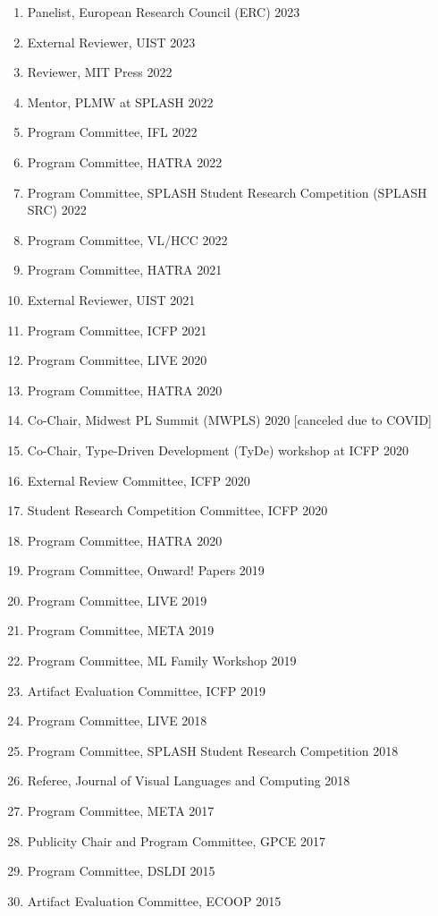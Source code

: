 \documentclass[10pt,letterpaper]{article}
\begin{document}
\begin{enumerate}
  \item Panelist, European Research Council (ERC) 2023
  \item External Reviewer, UIST 2023
  \item Reviewer, MIT Press 2022
  \item Mentor, PLMW at SPLASH 2022
  \item Program Committee, IFL 2022
  \item Program Committee, HATRA 2022
  \item Program Committee, SPLASH Student Research Competition (SPLASH SRC) 2022
  \item Program Committee, VL/HCC 2022
  \item Program Committee, HATRA 2021
  \item External Reviewer, UIST 2021
  \item Program Committee, ICFP 2021
  \item Program Committee, LIVE 2020
  \item Program Committee, HATRA 2020
  \item Co-Chair, Midwest PL Summit (MWPLS) 2020 [canceled due to COVID]
  \item Co-Chair, Type-Driven Development (TyDe) workshop at ICFP 2020
  \item External Review Committee, ICFP 2020
  \item Student Research Competition Committee, ICFP 2020
  \item Program Committee, HATRA 2020
  \item Program Committee, Onward! Papers 2019
  \item Program Committee, LIVE 2019
  \item Program Committee, META 2019
  \item Program Committee, ML Family Workshop 2019
  \item Artifact Evaluation Committee, ICFP 2019
  \item Program Committee, LIVE 2018
  \item Program Committee, SPLASH Student Research Competition 2018
  \item Referee, Journal of Visual Languages and Computing 2018
  \item Program Committee, META 2017
  \item Publicity Chair and Program Committee, GPCE 2017
  \item Program Committee, DSLDI 2015
  \item Artifact Evaluation Committee, ECOOP 2015
\end{enumerate}
\end{document}
